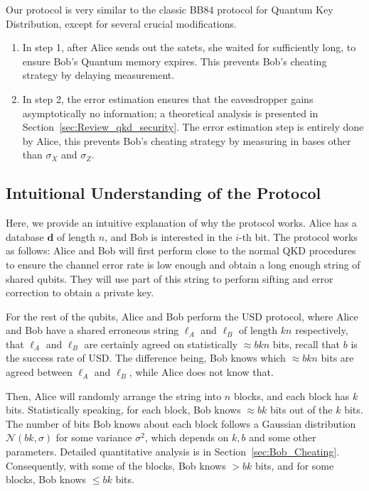 \documentclass[%
 reprint,
superscriptaddress,
 amsmath,amssymb,
 aps,
]{revtex4-2}
\begin{document}
Our protocol is very similar to the classic BB84 protocol for Quantum Key Distribution, except for several crucial modifications.

\begin{enumerate}
    \item In step 1, after Alice sends out the satets, she waited for sufficiently long, to ensure Bob's Quantum memory expires. This prevents Bob's cheating strategy by delaying measurement.
    
    \item In step 2, the error estimation ensures that the eavesdropper gains asymptotically no information; a theoretical analysis is presented in Section~\ref {sec:Review_qkd_security}. The error estimation step is entirely done by Alice, this prevents Bob's cheating strategy by measuring in bases other than $\sigma_X$ and $\sigma_Z$.
\end{enumerate}

\subsection{Intuitional Understanding of the Protocol}

Here, we provide an intuitive explanation of why the protocol works. Alice has a database $\mathbf{d}$ of length $n$, and Bob is interested in the $i$-th bit. The protocol works as follows: Alice and Bob will first perform close to the normal QKD procedures to ensure the channel error rate is low enough and obtain a long enough string of shared qubits. They will use part of this string to perform sifting and error correction to obtain a private key.

For the rest of the qubits, Alice and Bob perform the USD protocol, where Alice and Bob have a shared erroneous string $\mathbf{\ell}_A$ and $\mathbf{\ell}_B$ of length $kn$ respectively, that $\mathbf{\ell}_A$ and $\mathbf{\ell}_B$ are certainly agreed on statistically $\approx bkn$ bits, recall that $b$ is the success rate of USD. The difference being, Bob knows which $\approx bkn$ bits are agreed between $\mathbf{\ell}_A$ and $\mathbf{\ell}_B$, while Alice does not know that.

Then, Alice will randomly arrange the string into $n$ blocks, and each block has $k$ bits. Statistically speaking, for each block, Bob knows $\approx bk$ bits out of the $k$ bits. The number of bits Bob knows about each block follows a Gaussian distribution $\mathcal{N}(bk, \sigma)$ for some variance $\sigma^2$, which depends on $k, b$ and some other parameters. Detailed quantitative analysis is in Section~\ref{sec:Bob_Cheating}. Consequently, with some of the blocks, Bob knows $> bk$ bits, and for some blocks, Bob knows $\le bk$ bits.
\end{document}
